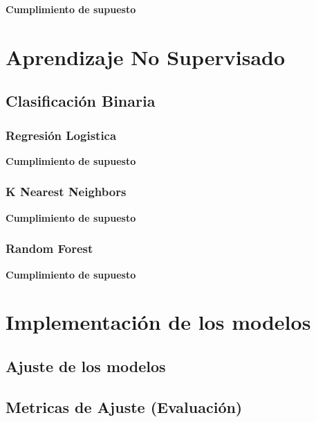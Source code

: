 \textbf{Cumplimiento de supuesto}

\section{Aprendizaje No Supervisado}


\subsection{Clasificación Binaria}


\subsubsection{Regresión Logistica}

\textbf{Cumplimiento de supuesto}


\subsubsection{K Nearest Neighbors}

\textbf{Cumplimiento de supuesto}

\subsubsection{Random Forest}

\textbf{Cumplimiento de supuesto}


\section{Implementación de los modelos}


\subsection{Ajuste de los modelos}


\subsection{Metricas de Ajuste (Evaluación)}
